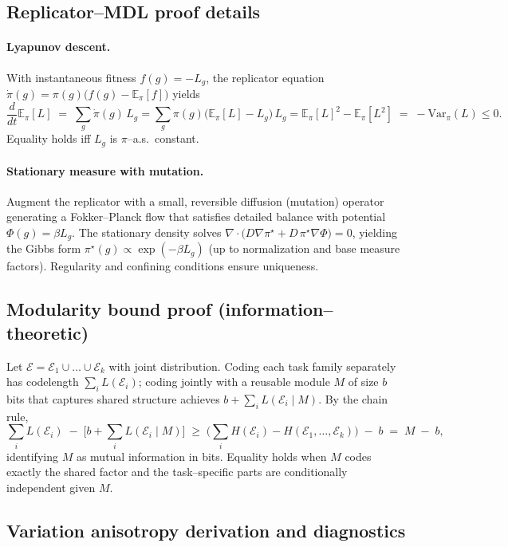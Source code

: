 \documentclass[11pt,a4paper]{article}
\newcommand{\E}{\mathbb{E}}
\begin{document}
\subsection{Replicator--MDL proof details}
\paragraph{Lyapunov descent.}
With instantaneous fitness $f(g)=-L_g$, the replicator equation $\dot{\pi}(g)=\pi(g)\big(f(g)-\E_\pi[f]\big)$ yields
\[
\frac{d}{dt}\E_\pi[L]\;=\;\sum_g \dot{\pi}(g)\,L_g
=\sum_g \pi(g)\big(\E_\pi[L]-L_g\big)\,L_g
=\E_\pi[L]^2 - \E_\pi[L^2]\;=\;-\mathrm{Var}_\pi(L)\le 0.
\]
Equality holds iff $L_g$ is $\pi$–a.s.\ constant.

\paragraph{Stationary measure with mutation.}
Augment the replicator with a small, reversible diffusion (mutation) operator generating a Fokker–Planck flow that satisfies detailed balance with potential $\Phi(g)=\beta L_g$. The stationary density solves $\nabla\!\cdot\!\big(D \nabla \pi^\star + D\,\pi^\star\nabla \Phi\big)=0$, yielding the Gibbs form $\pi^\star(g)\propto \exp(-\beta L_g)$ (up to normalization and base measure factors). Regularity and confining conditions ensure uniqueness.

\subsection{Modularity bound proof (information–theoretic)}
Let $\mathcal{E}=\mathcal{E}_1\cup\dots\cup\mathcal{E}_k$ with joint distribution. Coding each task family separately has codelength $\sum_i L(\mathcal{E}_i)$; coding jointly with a reusable module $M$ of size $b$ bits that captures shared structure achieves $b + \sum_i L(\mathcal{E}_i\mid M)$. By the chain rule,
\[
\sum_i L(\mathcal{E}_i) \;-\; \Big[b + \sum_i L(\mathcal{E}_i\mid M)\Big]
\;\ge\;
\Big(\sum_i H(\mathcal{E}_i) - H(\mathcal{E}_1,\dots,\mathcal{E}_k)\Big) \;-\; b
\;=\; M \;-\; b,
\]
identifying $M$ as mutual information in bits. Equality holds when $M$ codes exactly the shared factor and the task–specific parts are conditionally independent given $M$.

\subsection{Variation anisotropy derivation and diagnostics}
\end{document}
